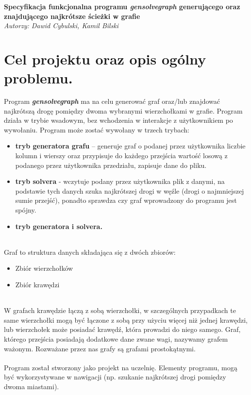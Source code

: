 \documentclass[polish, 12pt, a4paper]{article}
\begin{document}
\begin{titlepage}
   \begin{center}
      \Large\textbf{Specyfikacja funkcjonalna programu \textit{gensolvegraph} generującego oraz znajdującego najkrótsze ścieżki w grafie}\\
      \large\textit{Autorzy: Dawid Cybulski, Kamil Bilski}
   \end{center}
\end{titlepage}
\section {Cel projektu oraz opis ogólny problemu.}

Program \textbf{\textit{gensolvegraph}} ma na celu generować graf oraz/lub znajdować najkrótszą drogę pomiędzy dwoma wybranymi wierzchołkami w grafie. Program działa w trybie wsadowym, bez wchodzenia w interakcje z użytkownikiem po wywołaniu. Program może zostać wywołany w trzech trybach: 
\begin{itemize}
    \item \textbf{tryb generatora grafu} – generuje graf o podanej przez użytkownika liczbie kolumn i wierszy oraz przypisuje do każdego przejścia wartość losową z podanego przez użytkownika przedziału, zapisuje dane do pliku.
    \item \textbf{tryb solvera}  - wczytuje podany przez użytkownika plik z danymi, na podstawie tych danych szuka najkrótszej drogi w węźle (drogi o najmniejszej sumie przejść), ponadto sprawdza czy graf wprowadzony do programu jest spójny.
    \item \textbf{tryb generatora i solvera.}
\end{itemize}
\\
Graf to struktura danych składająca się z dwóch zbiorów: 
\begin{itemize}
    \item Zbiór wierzchołków
    \item Zbiór krawędzi
\end{itemize}
\\
W grafach krawędzie łączą z sobą wierzchołki, w szczególnych przypadkach te same wierzchołki mogą być łączone z sobą przy użyciu więcej niż jednej krawędzi, lub wierzchołek może posiadać krawędź, która prowadzi do niego samego. Graf, którego przejścia posiadają dodatkowe dane zwane wagi, nazywamy grafem ważonym. Rozważane przez nas grafy są grafami prostokątnymi.
\\
\\
Program został stworzony jako projekt na uczelnię. Elementy programu, mogą być wykorzystywane w nawigacji (np. szukanie najkrótszej drogi pomiędzy dwoma miastami).
\\
\\
\end{document}
